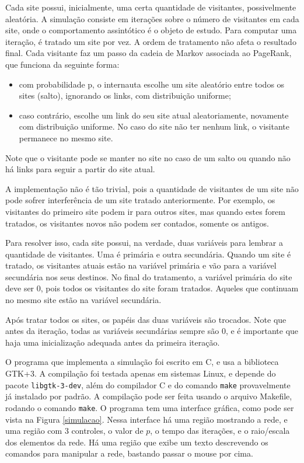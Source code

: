 \documentclass{article}
\begin{document}
Cada site possui, inicialmente, uma certa quantidade de visitantes, possivelmente aleatória. A simulação consiste em iterações sobre o número de visitantes em cada site, onde o comportamento assintótico é o objeto de estudo. Para computar uma iteração, é tratado um site por vez. A ordem de tratamento não afeta o resultado final. Cada visitante faz um passo da cadeia de Markov associada ao PageRank, que funciona da seguinte forma:
\begin{itemize}
    \item com probabilidade p, o internauta escolhe um site aleatório entre todos os sites (salto), ignorando os links, com distribuição uniforme;
    \item caso contrário, escolhe um link do seu site atual aleatoriamente, novamente com distribuição uniforme. No caso do site não ter nenhum link, o visitante permanece no mesmo site.
\end{itemize}

Note que o visitante pode se manter no site no caso de um salto ou quando não há links para seguir a partir do site atual.

A implementação não é tão trivial, pois a quantidade de visitantes de um site não pode sofrer interferência de um site tratado anteriormente. Por exemplo, os visitantes do primeiro site podem ir para outros sites, mas quando estes forem tratados, os visitantes novos não podem ser contados, somente os antigos.

Para resolver isso, cada site possui, na verdade, duas variáveis para lembrar a quantidade de visitantes. Uma é primária e outra secundária. Quando um site é tratado, os visitantes atuais estão na variável primária e vão para a variável secundária nos seus destinos. No final do tratamento, a variável primária do site deve ser $0$, pois todos os visitantes do site foram tratados. Aqueles que continuam no mesmo site estão na variável secundária.

Após tratar todos os sites, os papéis das duas variáveis são trocados. Note que antes da iteração, todas as variáveis secundárias sempre são $0$, e é importante que haja uma inicialização adequada antes da primeira iteração.

O programa que implementa a simulação foi escrito em C, e usa a biblioteca GTK+3. A compilação foi testada apenas em sistemas Linux, e depende do pacote \texttt{libgtk-3-dev}, além do compilador C e do comando \texttt{make} provavelmente já instalado por padrão. A compilação pode ser feita usando o arquivo Makefile, rodando o comando \texttt{make}. O programa tem uma interface gráfica, como pode ser vista na Figura \ref{simulacao}. Nessa interface há uma região mostrando a rede, e uma região com 3 controles, o valor de $p$, o tempo das iterações, e o raio/escala dos elementos da rede. Há uma região que exibe um texto descrevendo os comandos para manipular a rede, bastando passar o mouse por cima.
\end{document}
